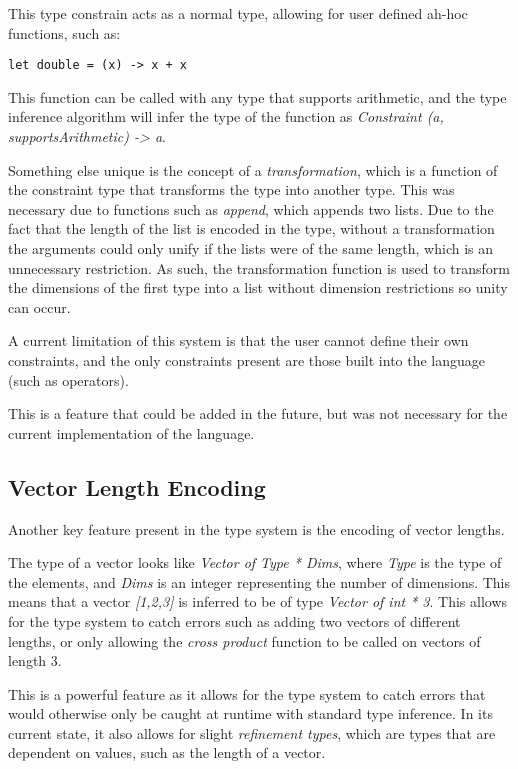 This type constrain acts as a normal type, allowing for user defined ah-hoc functions, such as:

\begin{verbatim}
let double = (x) -> x + x
\end{verbatim}

This function can be called with any type that supports arithmetic, and the type inference algorithm will infer the
type of the function as \textit{Constraint (a, supportsArithmetic) -> a}.

Something else unique is the concept of a \textit{transformation}, which is a function of the constraint type that
transforms the type into another type.
This was necessary due to functions such as \textit{append}, which appends two lists.
Due to the fact that the length of the list is encoded in the type, without a transformation the arguments could 
only unify if the lists were of the same length, which is an unnecessary restriction.
As such, the transformation function is used to transform the dimensions of the first type into a list without 
dimension restrictions so unity can occur.

A current limitation of this system is that the user cannot define their own constraints, and the only constraints 
present are those built into the language (such as operators).

This is a feature that could be added in the future, but was not necessary for the current implementation of the
language.

\subsection{Vector Length Encoding}\label{subsec:vector-length-enc}

Another key feature present in the type system is the encoding of vector lengths.

The type of a vector looks like \textit{Vector of Type * Dims}, where \textit{Type} is the type of the elements, and \textit{Dims} is an integer representing the number of dimensions.
This means that a vector \textit{[1,2,3]} is inferred to be of type \textit{Vector of int * 3}.
This allows for the type system to catch errors such as adding two vectors of different lengths, or only allowing the \textit{cross product} 
function to be called on vectors of length 3.

This is a powerful feature as it allows for the type system to catch errors that would otherwise only be caught at 
runtime with standard type inference.
In its current state, it also allows for slight \textit{refinement types}\citep{freeman1991refinement}, which are types that are dependent on values, such as the length of a vector.


